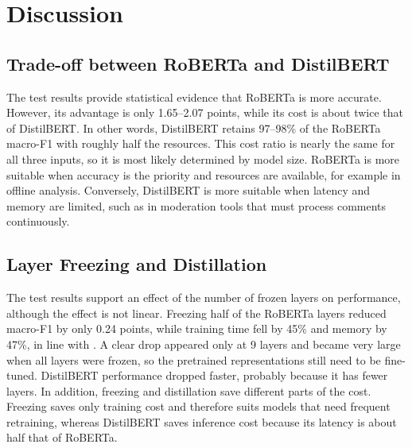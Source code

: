 \documentclass[conference]{IEEEtran}
\begin{document}
\section{Discussion}

\subsection{Trade-off between RoBERTa and DistilBERT}
The test results provide statistical evidence that RoBERTa is more accurate. However, its advantage is only 1.65--2.07 points, while its cost is about twice that of DistilBERT. In other words, DistilBERT retains 97--98\% of the RoBERTa macro-F1 with roughly half the resources. This cost ratio is nearly the same for all three inputs, so it is most likely determined by model size. RoBERTa is more suitable when accuracy is the priority and resources are available, for example in offline analysis. Conversely, DistilBERT is more suitable when latency and memory are limited, such as in moderation tools that must process comments continuously.

\subsection{Layer Freezing and Distillation}
The test results support an effect of the number of frozen layers on performance, although the effect is not linear. Freezing half of the RoBERTa layers reduced macro-F1 by only 0.24 points, while training time fell by 45\% and memory by 47\%, in line with \cite{ardakani2024slimfit}. A clear drop appeared only at 9 layers and became very large when all layers were frozen, so the pretrained representations still need to be fine-tuned. DistilBERT performance dropped faster, probably because it has fewer layers. In addition, freezing and distillation save different parts of the cost. Freezing saves only training cost and therefore suits models that need frequent retraining, whereas DistilBERT saves inference cost because its latency is about half that of RoBERTa.
\end{document}
